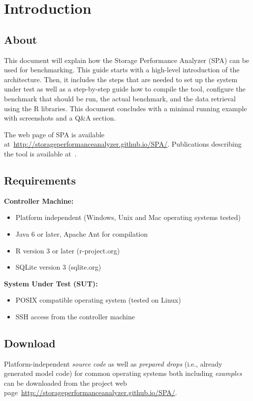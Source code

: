 
\chapter{Introduction}

\section{About}
This document will explain how the Storage Performance Analyzer (SPA) can be used for
benchmarking. This guide starts with a high-level introduction of the architecture. Then, it includes the steps that are needed to set up the system under test as well as a step-by-step guide how to compile the tool, configure the benchmark that should be run, the actual benchmark, and the data retrieval using the R libraries.
This document concludes with a minimal running example with screenshots and a Q\&A section.

The web page of SPA is available at~\url{http://storageperformanceanalyzer.github.io/SPA/}. Publications describing the tool is available at~\cite{noorshams2013a,noorshams2014a}. 

\section{Requirements}

\textbf{Controller Machine:}
\begin{itemize}
  \item Platform independent (Windows, Unix and Mac operating systems tested) 
  \item Java 6 or later, Apache Ant for compilation 
  \item R version 3 or later (r-project.org) 
  \item SQLite version 3 (sqlite.org)
\end{itemize}

\textbf{System Under Test (SUT):}
\begin{itemize}
  \item POSIX compatible operating system (tested on Linux)  
  \item SSH access from the controller machine
\end{itemize}

\section{Download}

Platform-independent \emph{source code} as well as \emph{prepared drops} (i.e., already generated model code) for common operating systems both including \emph{examples} can be downloaded from the project web page~\url{http://storageperformanceanalyzer.github.io/SPA/}.

